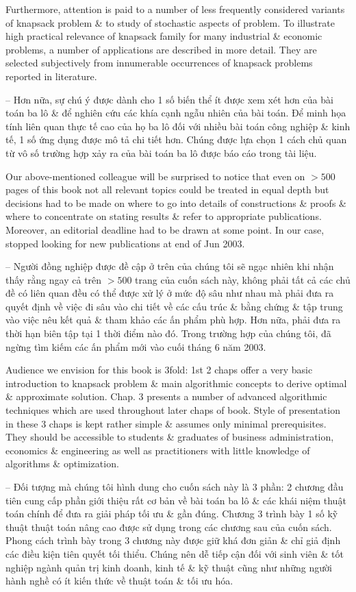 \documentclass{article}
\begin{document}
\begin{itemize}
    Furthermore, attention is paid to a number of less frequently considered variants of knapsack problem \& to study of stochastic aspects of problem. To illustrate high practical relevance of knapsack family for many industrial \& economic problems, a number of applications are described in more detail. They are selected subjectively from innumerable occurrences of knapsack problems reported in literature.
    
    -- Hơn nữa, sự chú ý được dành cho 1 số biến thể ít được xem xét hơn của bài toán ba lô \& để nghiên cứu các khía cạnh ngẫu nhiên của bài toán. Để minh họa tính liên quan thực tế cao của họ ba lô đối với nhiều bài toán công nghiệp \& kinh tế, 1 số ứng dụng được mô tả chi tiết hơn. Chúng được lựa chọn 1 cách chủ quan từ vô số trường hợp xảy ra của bài toán ba lô được báo cáo trong tài liệu.
    
    Our above-mentioned colleague will be surprised to notice that even on $> 500$ pages of this book not all relevant topics could be treated in equal depth but decisions had to be made on where to go into details of constructions \& proofs \& where to concentrate on stating results \& refer to appropriate publications. Moreover, an editorial deadline had to be drawn at some point. In our case, stopped looking for new publications at end of Jun 2003.
    
    -- Người đồng nghiệp được đề cập ở trên của chúng tôi sẽ ngạc nhiên khi nhận thấy rằng ngay cả trên $> 500$ trang của cuốn sách này, không phải tất cả các chủ đề có liên quan đều có thể được xử lý ở mức độ sâu như nhau mà phải đưa ra quyết định về việc đi sâu vào chi tiết về các cấu trúc \& bằng chứng \& tập trung vào việc nêu kết quả \& tham khảo các ấn phẩm phù hợp. Hơn nữa, phải đưa ra thời hạn biên tập tại 1 thời điểm nào đó. Trong trường hợp của chúng tôi, đã ngừng tìm kiếm các ấn phẩm mới vào cuối tháng 6 năm 2003.
    
    Audience we envision for this book is 3fold: 1st 2 chaps offer a very basic introduction to knapsack problem \& main algorithmic concepts to derive optimal \& approximate solution. Chap. 3 presents a number of advanced algorithmic techniques which are used throughout later chaps of book. Style of presentation in these 3 chaps is kept rather simple \& assumes only minimal prerequisites. They should be accessible to students \& graduates of business administration, economics \& engineering as well as practitioners with little knowledge of algorithms \& optimization.
    
    -- Đối tượng mà chúng tôi hình dung cho cuốn sách này là 3 phần: 2 chương đầu tiên cung cấp phần giới thiệu rất cơ bản về bài toán ba lô \& các khái niệm thuật toán chính để đưa ra giải pháp tối ưu \& gần đúng. Chương 3 trình bày 1 số kỹ thuật thuật toán nâng cao được sử dụng trong các chương sau của cuốn sách. Phong cách trình bày trong 3 chương này được giữ khá đơn giản \& chỉ giả định các điều kiện tiên quyết tối thiểu. Chúng nên dễ tiếp cận đối với sinh viên \& tốt nghiệp ngành quản trị kinh doanh, kinh tế \& kỹ thuật cũng như những người hành nghề có ít kiến thức về thuật toán \& tối ưu hóa.
    

\end{itemize}
\end{document}
